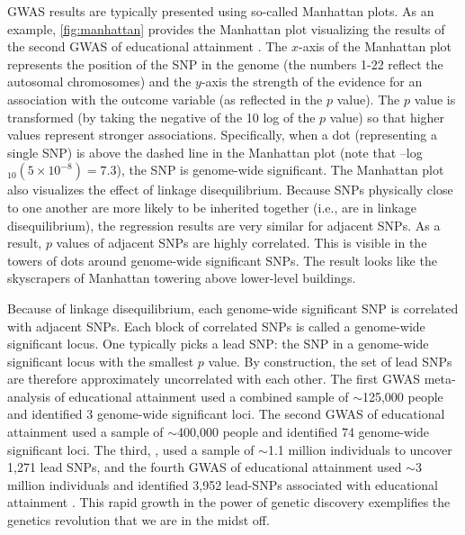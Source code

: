 \documentclass[12pt,a4paper]{article}
\begin{document}
\begin{bibunit}
GWAS results are typically presented using so-called Manhattan plots. As an example, \autoref{fig:manhattan} provides the Manhattan plot visualizing the results of the second GWAS of educational attainment \citep{okbay2016}. The $x$-axis of the Manhattan plot represents the position of the SNP in the genome (the numbers 1-22 reflect the autosomal chromosomes) and the $y$-axis the strength of the evidence for an association with the outcome variable (as reflected in the $p$ value). The $p$ value is transformed (by taking the negative of the 10 log of the $p$ value) so that higher values represent stronger associations. Specifically, when a dot (representing a single SNP) is above the dashed line in the Manhattan plot (note that –log$_{10}(5\times10^{-8}) = 7.3$), the SNP is genome-wide significant. The Manhattan plot also visualizes the effect of linkage disequilibrium. Because SNPs physically close to one another are more likely to be inherited together (i.e., are in linkage disequilibrium), the regression results are very similar for adjacent SNPs. As a result, $p$ values of adjacent SNPs are highly correlated. This is visible in the towers of dots around genome-wide significant SNPs. The result looks like the skyscrapers of Manhattan towering above lower-level buildings.

Because of linkage disequilibrium, each genome-wide significant SNP is correlated with adjacent SNPs. Each block of correlated SNPs is called a genome-wide significant locus. One typically picks a lead SNP: the SNP in a genome-wide significant locus with the smallest $p$ value. By construction, the set of lead SNPs are therefore approximately uncorrelated with each other. The first GWAS meta-analysis of educational attainment used a combined sample of $\sim$125,000 people \citep{Rietveld2013} and identified 3 genome-wide significant loci. The second GWAS of educational attainment used a sample of $\sim$400,000 people \citep{okbay2016} and identified 74 genome-wide significant loci. The third, \cite{lee2018gene}, used a sample of $\sim$1.1 million individuals to uncover 1,271 lead SNPs, and the fourth GWAS of educational attainment used $\sim$3 million individuals and identified 3,952 lead-SNPs associated with educational attainment \citep{Okbay2022}. This rapid growth in the power of genetic discovery exemplifies the genetics revolution that we are in the midst off. 


\end{bibunit}
\end{document}

